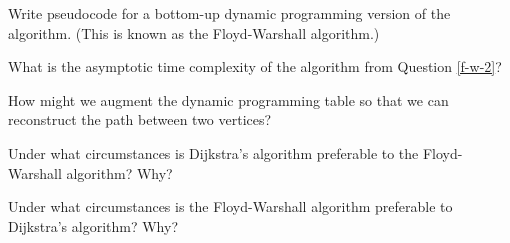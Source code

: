 \documentclass{tufte-handout}
\begin{document}
\begin{questions}
\item Write pseudocode for a bottom-up dynamic programming version of the algorithm. (This is known as the Floyd-Warshall algorithm.) \label{f-w-2}

\newpage

\item What is the asymptotic time complexity of the algorithm from Question \ref{f-w-2}?

\item How might we augment the dynamic programming table so that we can reconstruct the path between two vertices?

\item Under what circumstances is Dijkstra's algorithm preferable to the Floyd-Warshall algorithm? Why?

\item Under what circumstances is the Floyd-Warshall algorithm preferable to Dijkstra's algorithm? Why?

\end{questions}
\end{document}
